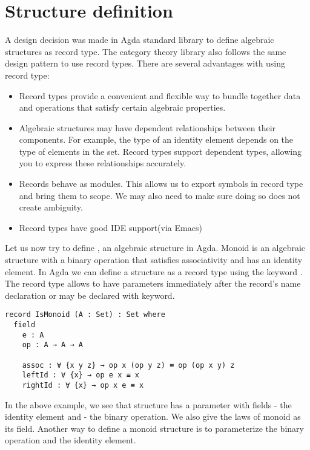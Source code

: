 \section{Structure definition}
A design decision was made in Agda standard library to define algebraic
structures as record type. The category theory library \cite{hu2021formalizing}
also follows the same design pattern to use record types. There are several
advantages with using record type:
\begin{itemize}
  \item Record types provide a convenient and flexible way to bundle
  together data and operations that satisfy certain algebraic properties. 
  \item Algebraic structures may have dependent relationships between their
  components. For example, the type of an identity element depends on the type
  of elements in the set. Record types support dependent types,
  allowing you to express these relationships accurately.
  \item Records behave as modules. This allows us to export symbols in record
  type and bring them to scope. We may also need to make sure doing so does not
  create ambiguity.
  \item Record types have good IDE support(via Emacs)
\end{itemize}

Let us now try to define , an algebraic structure in Agda.
Monoid is an algebraic structure with a binary operation that satisfies
associativity and has an identity element. In Agda we can define a structure as
a record type using the keyword . The record type allows to have
parameters immediately after the record's name declaration or may be declared
with  keyword.

\begin{verbatim}
record IsMonoid (A : Set) : Set where
  field
    e : A           
    op : A → A → A  

    assoc : ∀ {x y z} → op x (op y z) ≡ op (op x y) z
    leftId : ∀ {x} → op e x ≡ x
    rightId : ∀ {x} → op x e ≡ x  
\end{verbatim}

In the above example, we see that  structure has a parameter
 with fields  - the identity element and  -
the binary operation. We also give the laws of monoid as its field. Another way
to define a monoid structure is to parameterize the binary operation and the identity element.

